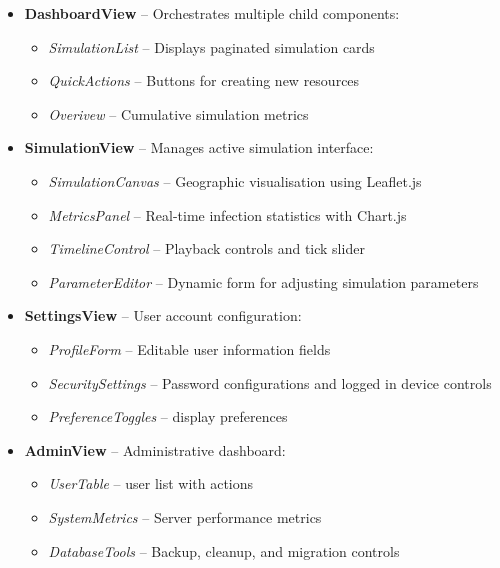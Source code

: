 \begin{itemize}
    \item \textbf{DashboardView} – Orchestrates multiple child components:
    \begin{itemize}
        \item \textit{SimulationList} – Displays paginated simulation cards
        \item \textit{QuickActions} – Buttons for creating new resources
        \item \textit{Overivew} – Cumulative simulation metrics
    \end{itemize}
    
    \item \textbf{SimulationView} – Manages active simulation interface:
    \begin{itemize}
        \item \textit{SimulationCanvas} – Geographic visualisation using Leaflet.js
        \item \textit{MetricsPanel} – Real-time infection statistics with Chart.js
        \item \textit{TimelineControl} – Playback controls and tick slider
        \item \textit{ParameterEditor} – Dynamic form for adjusting simulation parameters
    \end{itemize}
    
    \item \textbf{SettingsView} – User account configuration:
    \begin{itemize}
        \item \textit{ProfileForm} – Editable user information fields
        \item \textit{SecuritySettings} – Password configurations and logged in device controls
        \item \textit{PreferenceToggles} – display preferences
    \end{itemize}
    
    \item \textbf{AdminView} – Administrative dashboard:
    \begin{itemize}
        \item \textit{UserTable} – user list with actions
        \item \textit{SystemMetrics} – Server performance metrics
        \item \textit{DatabaseTools} – Backup, cleanup, and migration controls
    \end{itemize}
    

\end{itemize}

